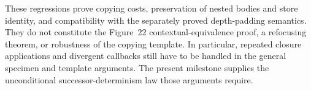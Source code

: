 

These regressions prove copying costs, preservation of nested bodies and
store identity, and compatibility with the separately proved depth-padding
semantics. They do not constitute the Figure~22 contextual-equivalence proof,
a refocusing theorem, or robustness of the copying template. In particular,
repeated closure applications and divergent callbacks still have to be handled
in the general specimen and template arguments. The present milestone supplies
the unconditional successor-determinism law those arguments require.
